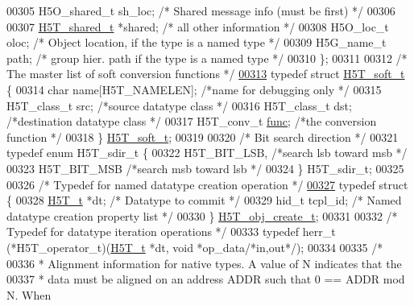\begin{DoxyCode}
00305     H5O\_shared\_t    sh\_loc;     \textcolor{comment}{/* Shared message info (must be first) */}
00306 
00307     \hyperlink{struct_h5_t__shared__t}{H5T\_shared\_t}   *shared;     \textcolor{comment}{/* all other information */}
00308     H5O\_loc\_t       oloc;       \textcolor{comment}{/* Object location, if the type is a named type */}
00309     H5G\_name\_t      path;       \textcolor{comment}{/* group hier. path if the type is a named type */}
00310 \};
00311 
00312 \textcolor{comment}{/* The master list of soft conversion functions */}
\hyperlink{struct_h5_t__soft__t}{00313} \textcolor{keyword}{typedef} \textcolor{keyword}{struct }\hyperlink{struct_h5_t__soft__t}{H5T\_soft\_t} \{
00314     \textcolor{keywordtype}{char}    name[H5T\_NAMELEN];  \textcolor{comment}{/*name for debugging only        */}
00315     H5T\_class\_t src;            \textcolor{comment}{/*source datatype class      */}
00316     H5T\_class\_t dst;            \textcolor{comment}{/*destination datatype class         */}
00317     H5T\_conv\_t  \hyperlink{structfunc}{func};           \textcolor{comment}{/*the conversion function        */}
00318 \} \hyperlink{struct_h5_t__soft__t}{H5T\_soft\_t};
00319 
00320 \textcolor{comment}{/* Bit search direction */}
00321 \textcolor{keyword}{typedef} \textcolor{keyword}{enum} H5T\_sdir\_t \{
00322     H5T\_BIT\_LSB,            \textcolor{comment}{/*search lsb toward msb          */}
00323     H5T\_BIT\_MSB             \textcolor{comment}{/*search msb toward lsb          */}
00324 \} H5T\_sdir\_t;
00325 
00326 \textcolor{comment}{/* Typedef for named datatype creation operation */}
\hyperlink{struct_h5_t__obj__create__t}{00327} \textcolor{keyword}{typedef} \textcolor{keyword}{struct }\{
00328     \hyperlink{struct_h5_t__t}{H5T\_t} *dt;                  \textcolor{comment}{/* Datatype to commit */}
00329     hid\_t tcpl\_id;              \textcolor{comment}{/* Named datatype creation property list */}
00330 \} \hyperlink{struct_h5_t__obj__create__t}{H5T\_obj\_create\_t};
00331 
00332 \textcolor{comment}{/* Typedef for datatype iteration operations */}
00333 \textcolor{keyword}{typedef} herr\_t (*H5T\_operator\_t)(\hyperlink{struct_h5_t__t}{H5T\_t} *dt, \textcolor{keywordtype}{void} *op\_data\textcolor{comment}{/*in,out*/});
00334 
00335 \textcolor{comment}{/*}
00336 \textcolor{comment}{ * Alignment information for native types. A value of N indicates that the}
00337 \textcolor{comment}{ * data must be aligned on an address ADDR such that 0 == ADDR mod N. When}

\end{DoxyCode}
